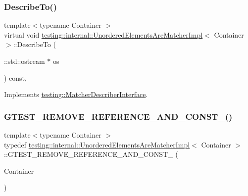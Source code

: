 \subsubsection{\texorpdfstring{Describe\+To()}{DescribeTo()}}
{\footnotesize\ttfamily template$<$typename Container $>$ \\
virtual void \hyperlink{classtesting_1_1internal_1_1_unordered_elements_are_matcher_impl}{testing\+::internal\+::\+Unordered\+Elements\+Are\+Matcher\+Impl}$<$ Container $>$\+::Describe\+To (\begin{DoxyParamCaption}\item[{\+::std\+::ostream $\ast$}]{os }\end{DoxyParamCaption}) const\hspace{0.3cm}{\ttfamily [inline]}, {\ttfamily [virtual]}}



Implements \hyperlink{classtesting_1_1_matcher_describer_interface_ad9f861588bd969b6e3e717f13bb94e7b}{testing\+::\+Matcher\+Describer\+Interface}.

\mbox{\label{classtesting_1_1internal_1_1_unordered_elements_are_matcher_impl_a6e8b7d421741a66ee7f2ebff7372897e}} 
\subsubsection{\texorpdfstring{G\+T\+E\+S\+T\+\_\+\+R\+E\+M\+O\+V\+E\+\_\+\+R\+E\+F\+E\+R\+E\+N\+C\+E\+\_\+\+A\+N\+D\+\_\+\+C\+O\+N\+S\+T\+\_\+()}{GTEST\_REMOVE\_REFERENCE\_AND\_CONST\_()}}
{\footnotesize\ttfamily template$<$typename Container $>$ \\
typedef \hyperlink{classtesting_1_1internal_1_1_unordered_elements_are_matcher_impl}{testing\+::internal\+::\+Unordered\+Elements\+Are\+Matcher\+Impl}$<$ Container $>$\+::G\+T\+E\+S\+T\+\_\+\+R\+E\+M\+O\+V\+E\+\_\+\+R\+E\+F\+E\+R\+E\+N\+C\+E\+\_\+\+A\+N\+D\+\_\+\+C\+O\+N\+S\+T\+\_\+ (\begin{DoxyParamCaption}\item[{Container}]{ }\end{DoxyParamCaption})}

